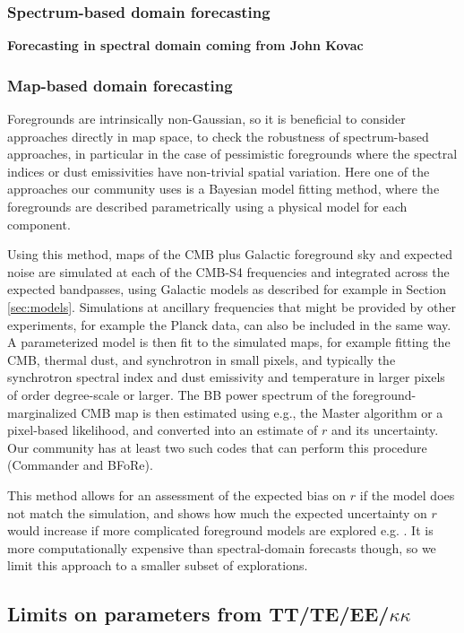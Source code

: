 \subsubsection{Spectrum-based domain forecasting}
{\bf Forecasting in spectral domain coming from John Kovac}

\subsubsection{Map-based domain forecasting}

Foregrounds are intrinsically non-Gaussian, so it is beneficial to consider approaches directly in map space, to check the robustness of spectrum-based approaches, in particular in the case of pessimistic foregrounds where the spectral indices or dust emissivities have non-trivial spatial variation. Here one of the approaches our community uses is a Bayesian model fitting method, where the foregrounds are described parametrically using a physical model for each component.

Using this method, maps of the CMB plus Galactic foreground sky and expected noise are simulated at each of the CMB-S4 frequencies and integrated across the expected bandpasses, using Galactic models as described for example in Section \ref{sec:models}. Simulations at ancillary frequencies that might be provided by other experiments, for example the Planck data, can also be included in the same way. A parameterized model is then fit to the simulated maps, for example fitting the CMB, thermal dust, and synchrotron in small pixels, and typically the synchrotron spectral index and dust emissivity and temperature in larger pixels of order degree-scale or larger. The BB power spectrum of the foreground-marginalized CMB map is then estimated using e.g., the Master algorithm or a pixel-based likelihood, and converted into an estimate of $r$ and its uncertainty. Our community has at least two such codes that can perform this procedure (Commander and BFoRe).

This method allows for an assessment of the expected bias on $r$ if the model does not match the simulation, and shows how much the expected uncertainty on $r$ would increase if more complicated foreground models are explored e.g. \cite{armitage-caplan/etal:2011,ramazeilles/etal:2015}. It is more computationally expensive than spectral-domain forecasts though, so we limit this approach to a smaller subset of explorations. 

\subsection{Limits on parameters from TT/TE/EE/$\kappa\kappa$}

